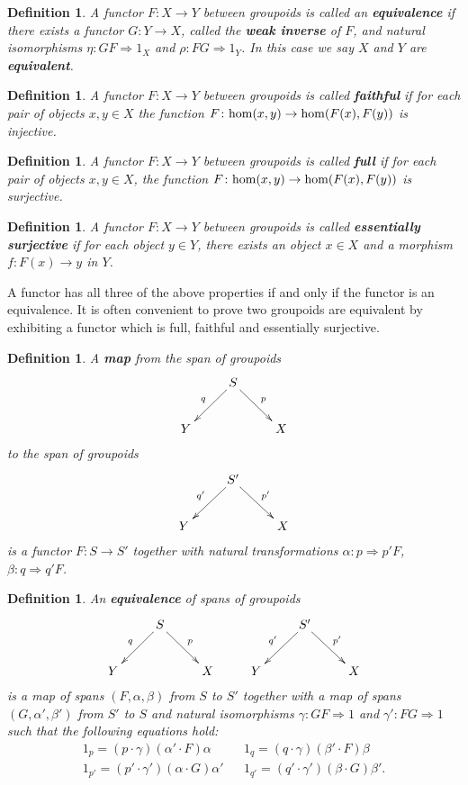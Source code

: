 \documentclass{article}
\renewcommand{\hom}{{\rm hom}}
\newcommand{\To}{\Rightarrow}
\renewcommand{\to}{\rightarrow}
\newcommand{\maps}{\colon}
\newtheorem{definition}[thm]{Definition}
\begin{document}
\begin{definition}
\label{equivalence_of_groupoids}
A functor $F \maps X \to Y$ between groupoids is called an {\bf
equivalence} if there exists a functor $G \maps Y \to X$, called the
{\bf weak inverse} of $F$, and natural isomorphisms $\eta \maps GF \To
1_X$ and $\rho \maps FG \To 1_Y$.  In this case we say $X$ and $Y$ are
{\bf equivalent}.
\end{definition}

\begin{definition}
A functor $F \maps X \to Y$ between groupoids is called {\bf faithful}
if for each pair of objects $x,y \in X$ the function $F \maps
\hom(x,y) \to \hom(F(x),F(y))$ is injective.
\end{definition}

\begin{definition}
A functor $F \maps X \to Y$ between groupoids is called {\bf full} if
for each pair of objects $x,y \in X$, the function $F \maps
\hom(x,y) \to \hom(F(x),F(y))$ is surjective.
\end{definition}

\begin{definition}
A functor $F \maps X \to Y$ between groupoids is called {\bf
essentially surjective} if for each object $y \in Y$, there
exists an object $x \in X$ and a morphism $f \maps F(x) \to y$ in
$Y$.
\end{definition}

\noindent
A functor has all three of the above properties if and only if the functor
is an equivalence.  It is often convenient to prove two groupoids are
equivalent by exhibiting a functor which is full, faithful and
essentially surjective.

\begin{definition}\label{MAP}
A {\bf map} from the span of groupoids
\[
\xymatrix{
& S\ar[dl]_{q} \ar[dr]^{p}   \\
Y & & X 
}
\]
to the span of groupoids
\[
\xymatrix{
& S'\ar[dl]_{q'} \ar[dr]^{p'}   \\
Y & & X 
}
\]
is a functor $F \maps S \to S'$ together with natural transformations
$\alpha \maps p \To p' F$, $\beta \maps q \To q' F$.
\end{definition}

\begin{definition}\label{EQUIVALENCE}
An {\bf equivalence} of spans of groupoids
\[
\xymatrix{
& S\ar[dl]_{q} \ar[dr]^{p} &  & & S'\ar[dl]_{q'} \ar[dr]^{p'} &\\
Y & & X & Y & & X
}
\]
is a map of spans $(F,\alpha,\beta)$ from $S$ to $S'$ together with a
map of spans $(G,\alpha',\beta')$ from $S'$ to $S$ and
natural isomorphisms $\gamma \maps GF \Rightarrow 1$ and $\gamma'
\maps FG \Rightarrow 1$ such that the following equations hold:
\[   \begin{array}{lll}
 1_p = (p \cdot \gamma)(\alpha'\cdot F) \alpha & &
 1_q = (q \cdot \gamma)(\beta'\cdot F) \beta \\
 1_{p'} = (p' \cdot \gamma')(\alpha\cdot G) \alpha' & &
 1_{q'} = (q' \cdot \gamma')(\beta\cdot G) \beta' .
\end{array}
\]
\end{definition}
\end{document}
